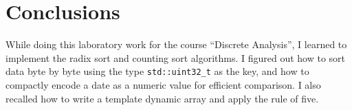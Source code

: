 \section{Conclusions}
While doing this laboratory work for the course \enquote{Discrete Analysis},
I learned to implement the radix sort and counting sort algorithms.
I figured out how to sort data byte by byte using the type \texttt{std::uint32\_t}
as the key, and how to compactly encode a date as a numeric value
for efficient comparison. I also recalled how to write a template dynamic array
and apply the rule of five.
\pagebreak
